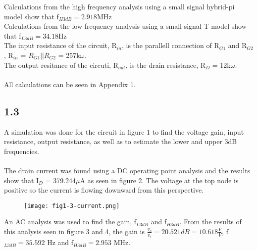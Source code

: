   Calculations from the high frequency analysis using a small signal hybrid-pi model show that f$_{H 3dB} = 2.918$MHz\\

  Calculations from the low frequency analysis using a small signal T model show that f$_{L 3dB} = 34.18$Hz\\

  The input resistance of the circuit, R$_{in}$, is the parallell connection of R$_{G1}$ and R$_{G2}$, R$_{in}$ = $R_{G1}||R_{G2}$ = 257k$\omega$.\\
  The output resitance of the circuti, R$_{out}$, is the drain resistance, R$_D$ = 12k$\omega$.\\\\

  All calculations can be seen in Appendix 1.

\subsection*{1.3}

  A simulation was done for the circuit in figure 1 to find the voltage gain, input resistance, output resistance, as well as to estimate the lower and upper 3dB frequencies.\\\\

  The drain current was found using a DC operating point analysis and the results show that I$_D$ = 379.244$\mu$A as seen in figure 2. The voltage at the top node is positive so the current is flowing downward from this perspective.\\

  \begin{figure}[h!]
        \centering
        \texttt{[image: fig1-3-current.png]}
  \end{figure}

  An AC analysis was used to find the gain, f$_{L 3dB}$ and f$_{H 3dB}$. From the results of this analysis seen in figure 3 and 4, the gain is $\frac{v_o}{v_i} = 20.521 dB = 10.618 \frac{V}{V}$, f$_{L 3dB} = 35.592$ Hz and f$_{H 3dB} = 2.953$ MHz.\\

